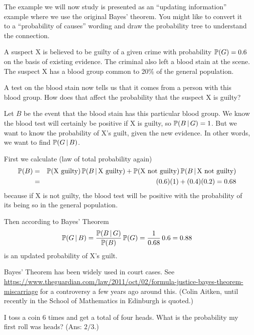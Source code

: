 \begin{example}
The example we will now study is presented as an ``updating information'' example where we use the original Bayes' theorem.  You might like to convert it to a ``probability of causes'' wording and draw the probability tree to understand the connection.

A suspect X is believed to be guilty of a given crime with probability ${\mathbb P}(G)=0.6$ on the basis of existing evidence.  The criminal also left a blood stain at the scene. The suspect X has a blood group common to 20\% of the general population.

A test on the blood stain now tells us that it comes from a person with this blood group. How does that affect the probability that the suspect X is guilty? 


Let $B$ be the event that the blood stain has this particular blood group.  We know the blood test will certainly be positive if X is guilty, so ${\mathbb P}( B \, | \, G) = 1$.  But we want to know the probability of X's guilt, given the new evidence. In other words, we want to find ${\mathbb P}( G \, | \, B)$. 


First we calculate (law of total probability again) 
 \begin{eqnarray*}
  {\mathbb P}(B) &=& {\mathbb P}(\text{X guilty}) \,{\mathbb P}(B \, | \, \text{X guilty})   + {\mathbb P}(\text{X not guilty}) \,  {\mathbb P}(B \, | \, \text{X not guilty} ) \\
  &=& (0.6) (1) + (0.4) (0.2)  = 0.68
 \end{eqnarray*}
 because if X is not guilty, the blood test will be positive with the probability of its being so in the general population.
 
Then according to Bayes' Theorem
 \[
    {\mathbb P}( G \, | \, B) =  \frac{{\mathbb P}( B \, | \, G)}{{\mathbb P}(B)} \, {\mathbb P}(G)
    =  \frac{1}{0.68} \, 0.6 = 0.88 
 \]
is an updated probability of X's guilt. 

Bayes' Theorem has been widely used in court cases. See \url{https://www.theguardian.com/law/2011/oct/02/formula-justice-bayes-theorem-miscarriage} for a controversy a few years ago around this. (Colin Aitken, until recently in the School of Mathematics in Edinburgh is quoted.) 
\end{example}

\begin{example}
I toss a coin 6 times and get a total of four heads. What is the probability my first roll was heads?  (Ans: $2/3$.) 
\end{example}



